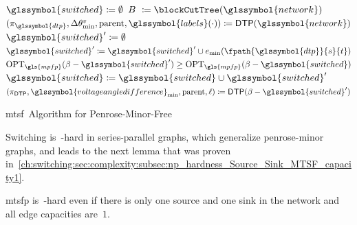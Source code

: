 %
% 
\def\HiLi{\leavevmode\rlap{\hbox to \hsize{\color{KITyellow15}\leaders\hrule
height .9\baselineskip depth 1.5ex\hfill}}}
\begin{algorithm}[tb!]%
\SetAlgoLined
  $\glssymbol{switched} \coloneqq \emptyset$\;
  $\blocks\ \coloneqq \blockCutTree(\glssymbol{network})$
  $(\pathu_{\glssymbol{dtp}}, \deltaangle_{\min}, \parent, \glssymbol{labels}(\cdot)) \coloneqq \dtp
  (\glssymbol{network})$
  \For{$\block\in\blocks$}
  {
    $\glssymbol{switched}' \coloneqq \emptyset$\;
    {
      $\glssymbol{switched}' 
      \coloneqq 
      \glssymbol{switched}'
      \cup
      \edge_{\min}(\fpath{\glssymbol{dtp}}{\source}{\sink})$\;
      \If
      {$\opt_{\gls{mpfp}}(\block-\glssymbol{switched}')\geq\opt_{\gls{mpfp}}
      (\block-
      \glssymbol{switched})$}
      {
        $\glssymbol{switched} \coloneqq \glssymbol{switched} \cup 
        \glssymbol{switched}'$
      }
      $(\pathu_{\dtp}, \glssymbol{voltageangledifference}_{\min}, \parent, \lab)
      \coloneqq
      \dtp
      (\block-\glssymbol{switched}')$
    }
  }%
  \;
  \caption{\gls{mtsf}\ Algorithm for Penrose-Minor-Free~}%
  \label{ch:switching:sec:exploit_structural_characteristics:alg:msf_series_parallel_structures}%
\end{algorithm}%
%
Switching is~\NP-hard in series-parallel graphs, which generalize
penrose-minor graphs, and leads to the next lemma that was proven in~\cref{ch:switching:sec:complexity:subsec:np_hardness_Source_Sink_MTSF_capacity1}.
% 
\begin{lemma}
    \gls{mtsfp} is~\NP-hard even if there is only one source and one sink in
    the network and all edge capacities are~$1$.
\end{lemma}

